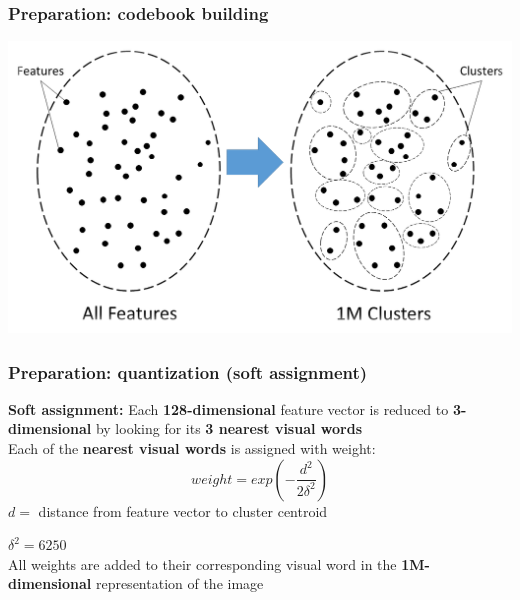 \begin{frame}
	\frametitle{Preparation: codebook building}
	\begin{center}
	\includegraphics[width=\textwidth]{images/cluster2.png}
	\end{center}
\end{frame}

\begin{frame}
	\frametitle{Preparation: quantization (soft assignment)}
	\textbf{Soft assignment:} Each \textbf{128-dimensional} feature vector is reduced to \textbf{3-dimensional} by looking for its \textbf{3 nearest visual words}\\
	Each of the \textbf{nearest visual words} is assigned with \alert{weight}:
    \begin{equation*}
    	weight = exp(-\frac{d^2}{2\delta^2})
    \end{equation*}
\hspace{4ex} $d = $ distance from feature vector to cluster centroid

\hspace{4ex} $\delta^2 = 6250$\\

    All weights are added to their corresponding visual word in the \textbf{1M-dimensional} representation of the image
\end{frame}

